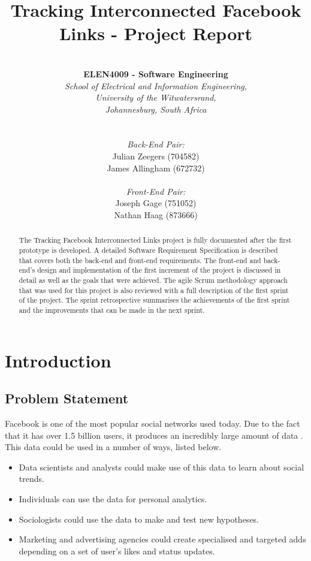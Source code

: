 \documentclass[12pt,onecolumn]{article}
\title{\huge Tracking Interconnected Facebook Links - Project Report}
\author{ \horrule{1pt} \\ \textbf{ELEN4009 - Software Engineering} \\ \emph{School of Electrical and Information Engineering,} \\ \emph{University of the Witwatersrand,} \\ \emph{Johannesburg, South Africa} \\ \horrule{1pt} \\\\ \emph{Back-End Pair:} \\ Julian Zeegers (704582) \\ James Allingham (672732) \\ \\ \emph{Front-End Pair:} \\ Joseph Gage (751052)\\ Nathan Haag (873666) \\ \horrule{1pt}}
\begin{document}
	\date{\vspace{-5ex}}
	\maketitle
	\pagestyle{plain}
	\thispagestyle{empty}
	
	\begin{abstract}
		The Tracking Facebook Interconnected Links project is fully documented after the first prototype is developed. A detailed Software Requirement Specification is described that covers both the back-end and front-end requirements. The front-end and back-end's design and implementation of the first increment of the project is discussed in detail as well as the goals that were achieved. The agile Scrum methodology approach that was used for this project is also reviewed with a full description of the first sprint of the project. The sprint retrospective summarises the achievements of the first sprint and the improvements that can be made in the next sprint. 
	\end{abstract}
	
	\setcounter{page}{0}
	
	\newpage
	
	\tableofcontents
	\listoffigures
	\listoftables
	
	\newpage
	
	\setcounter{page}{0}
	
	\section{Introduction}
	
	\subsection{Problem Statement} %
	
	Facebook is one of the most popular social networks used today. Due to the fact that it has over 1.5 billion users, it produces an incredibly large amount of data \cite{fb}. This data could be used in a number of ways, listed below.
	
	\begin{itemize}
		\item Data scientists and analysts could make use of this data to learn about social trends.
		
		\item Individuals can use the data for personal analytics.
		
		\item Sociologists could use the data to make and test new hypotheses.
		
		\item Marketing and advertising agencies could create specialised and targeted adds depending on a set of user's likes and status updates.
		
	\end{itemize}    
	
\end{document}

